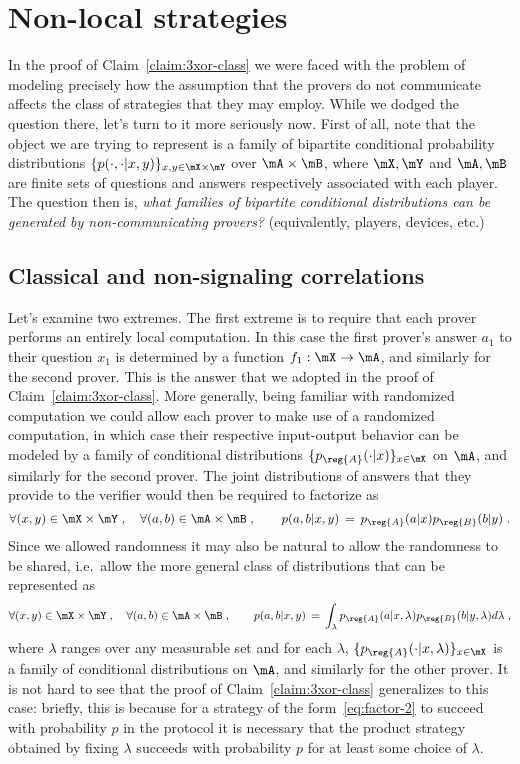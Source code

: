 \section{Non-local strategies}

In the proof of Claim~\ref{claim:3xor-class} we were faced with the problem of modeling precisely how the assumption that the provers do not communicate affects the class of strategies that they may employ. While we dodged the question there, let's turn to it more seriously now. First of all, note that the object we are trying to represent is a family of bipartite conditional probability distributions $\{p(\cdot,\cdot|x,y)\}_{x,y\in \mX\times\mY}$ over $\mA\times \mB$, where $\mX,\mY$ and $\mA,\mB$ are finite sets of questions and answers respectively associated with each player. The question then is, \emph{what families of bipartite conditional distributions can be generated by non-communicating provers?} (equivalently, players, devices, etc.) 

\subsection{Classical and non-signaling correlations}

Let's examine two extremes. The first extreme is to require that each prover performs an entirely local computation. In this case the first prover's answer $a_1$ to their question $x_1$ is determined by a function $f_1:\mX \to \mA$, and similarly for the second prover. This is the answer that we adopted in the proof of Claim~\ref{claim:3xor-class}. More generally, being familiar with randomized computation we could allow each prover to make use of a randomized computation, in which case their respective input-output behavior can be modeled by a family of conditional distributions $\{p_\reg{A}(\cdot|x)\}_{x\in \mX}$ on $\mA$, and similarly for the second prover. The joint distributions of answers that they provide to the verifier would then be required to factorize as 
\begin{equation}\label{eq:factor}
\forall (x,y)\in\mX\times\mY\;,\quad\forall (a,b)\in\mA\times\mB\;,\qquad p(a,b|x,y)\,=\,p_\reg{A}(a|x)p_\reg{B}(b|y)\;.
\end{equation}
Since we allowed randomness it may also be natural to allow the randomness to be shared, i.e.\ allow the more general class of distributions that can be represented as 
\begin{equation}\label{eq:factor-2}
\forall (x,y)\in\mX\times\mY\;,\quad\forall (a,b)\in\mA\times\mB\;,\qquad p(a,b|x,y)\,=\,\int_\lambda p_\reg{A}(a|x,\lambda)p_\reg{B}(b|y,\lambda) d\lambda\;,
\end{equation}
where $\lambda$ ranges over any measurable set and for each $\lambda$, $\{p_{\reg{A}}(\cdot|x,\lambda)\}_{x\in\mX}$ is a family of conditional distributions on $\mA$, and similarly for the other prover. It is not hard to see that the proof of Claim~\ref{claim:3xor-class} generalizes to this case: briefly, this is because for a strategy of the form~\eqref{eq:factor-2} to succeed with probability $p$ in the protocol it is necessary that the product strategy obtained by fixing $\lambda$ succeeds with probability $p$ for at least some choice of $\lambda$.  

